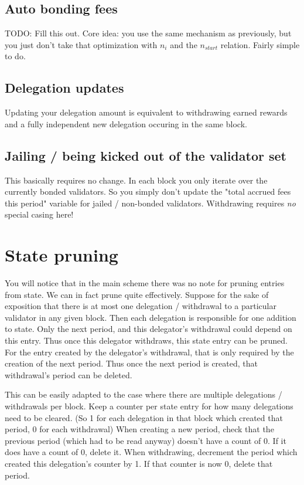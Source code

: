 \documentclass[]{article}
\begin{document}
\subsection{Auto bonding fees}
TODO: Fill this out. 
Core idea: you use the same mechanism as previously, but you just don't take that optimization with $n_{i}$ and the $n_{start}$ relation.
Fairly simple to do.

\subsection{Delegation updates}
Updating your delegation amount is equivalent to withdrawing earned rewards and a fully independent new delegation occuring in the same block.

\subsection{Jailing / being kicked out of the validator set}
This basically requires no change.
In each block you only iterate over the currently bonded validators.
So you simply don't update the "total accrued fees this period" variable for jailed / non-bonded validators.
Withdrawing requires \textit{no} special casing here!

\section{State pruning}
You will notice that in the main scheme there was no note for pruning entries from state.
We can in fact prune quite effectively.
Suppose for the sake of exposition that there is at most one delegation / withdrawal to a particular validator in any given block.
Then each delegation is responsible for one addition to state.
Only the next period, and this delegator's withdrawal could depend on this entry. Thus once this delegator withdraws, this state entry can be pruned.
For the entry created by the delegator's withdrawal, that is only required by the creation of the next period.
Thus once the next period is created, that withdrawal's period can be deleted.

This can be easily adapted to the case where there are multiple delegations / withdrawals per block.
Keep a counter per state entry for how many delegations need to be cleared.
(So 1 for each delegation in that block which created that period, 0 for each withdrawal)
When creating a new period, check that the previous period (which had to be read anyway) doesn't have a count of 0.
If it does have a count of 0, delete it.
When withdrawing, decrement the period which created this delegation's counter by 1.
If that counter is now 0, delete that period.
\end{document}
